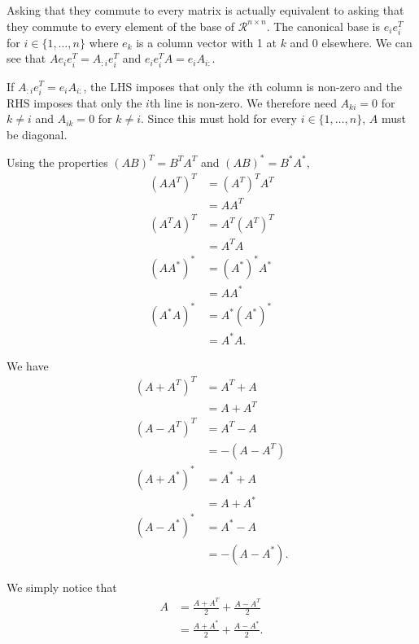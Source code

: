\begin{solution}
  Asking that they commute to every matrix is actually equivalent to asking
  that they commute to every element of the base of $\mathcal{R}^{n \times n}$.
  The canonical base is $e_ie_i^T$ for $i \in \{1, \ldots, n\}$ where
  $e_k$ is a column vector with 1 at $k$ and 0 elsewhere.
  We can see that $Ae_ie_i^T = A_{:i}e_i^T$ and $e_ie_i^TA = e_iA_{i:}$.

  If $A_{:i}e_i^T = e_iA_{i:}$, the LHS imposes that only the $i$th column is non-zero
  and the RHS imposes that only the $i$th line is non-zero.
  We therefore need $A_{ki} = 0$ for $k \neq i$ and $A_{ik} = 0$ for $k \neq i$.
  Since this must hold for every $i \in \{1, \ldots, n\}$, $A$ must be diagonal.
\end{solution}

\begin{solution}
  Using the properties $(AB)^T = B^TA^T$ and $(AB)^* = B^*A^*$,
  \begin{align*}
    (AA^T)^T & = (A^T)^TA^T\\
             & = AA^T\\
    (A^TA)^T & = A^T(A^T)^T\\
             & = A^TA\\
    (AA^*)^* & = (A^*)^*A^*\\
             & = AA^*\\
    (A^*A)^* & = A^*(A^*)^*\\
             & = A^*A.
  \end{align*}
\end{solution}

\begin{solution}
  We have
  \begin{align*}
    (A + A^T)^T & = A^T + A\\
                & = A + A^T\\
    (A - A^T)^T & = A^T - A\\
                & = -(A - A^T)\\
    (A + A^*)^* & = A^* + A\\
                & = A + A^*\\
    (A - A^*)^* & = A^* - A\\
                & = -(A - A^*).
  \end{align*}
\end{solution}

\begin{solution}
  We simply notice that
  \begin{align*}
    A & = \frac{A + A^T}{2} + \frac{A - A^T}{2}\\
      & = \frac{A + A^*}{2} + \frac{A - A^*}{2}.
  \end{align*}
\end{solution}

